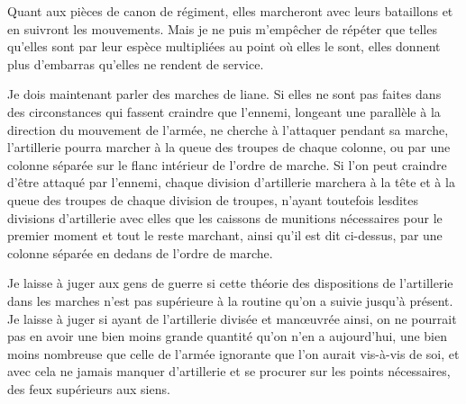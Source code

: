 \documentclass[french,twoside]{book} %
\begin{document}
Quant aux pièces de canon de régiment, elles marcheront avec leurs bataillons et en suivront les mouvements. Mais je ne puis m’empêcher de répéter que telles qu’elles sont par leur espèce multipliées au point où elles le sont, elles donnent plus d’embarras qu’elles ne rendent de service.\par
Je dois maintenant parler des marches de liane. Si elles ne sont pas faites dans des circonstances qui fassent craindre que l’ennemi, longeant une parallèle à la direction du mouvement de l’armée, ne cherche à l’attaquer pendant sa marche, l’artillerie pourra marcher à la queue des troupes de chaque colonne, ou par une colonne séparée sur le flanc intérieur de l’ordre de marche. Si l’on peut craindre d’être attaqué par l’ennemi, chaque division d’artillerie marchera à la tête et à la queue des troupes de chaque division de troupes, n’ayant toutefois lesdites divisions d’artillerie avec elles que les caissons de munitions nécessaires pour le premier moment et tout le reste marchant, ainsi qu’il est dit ci-dessus, par une colonne séparée en dedans de l’ordre de marche.\par
Je laisse à juger aux gens de guerre si cette théorie des dispositions de l’artillerie dans les marches n’est pas supérieure à la routine qu’on a suivie jusqu’à présent. Je laisse à juger si ayant de l’artillerie divisée et manœuvrée ainsi, on ne pourrait pas en avoir une bien moins grande quantité qu’on n’en a aujourd’hui, une bien moins nombreuse que celle de l’armée ignorante que l’on aurait vis-à-vis de soi, et avec cela ne jamais manquer d’artillerie et se procurer sur les points nécessaires, des feux supérieurs aux siens.
\end{document}

